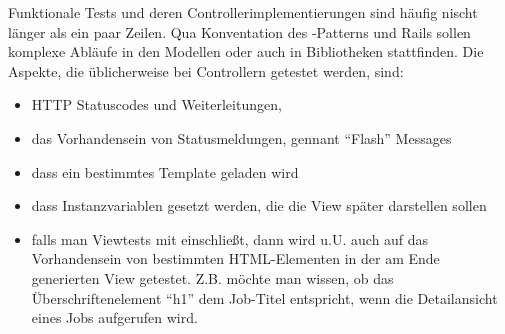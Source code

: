 Funktionale Tests und deren Controllerimplementierungen sind häufig nischt länger als ein paar Zeilen. Qua Konventation des -Patterns und Rails sollen komplexe Abläufe in den Modellen oder auch in Bibliotheken stattfinden. 
Die Aspekte, die üblicherweise bei Controllern getestet werden, sind:
\begin{itemize}
 \item HTTP Statuscodes und Weiterleitungen,
 \item das Vorhandensein von Statusmeldungen, gennant "`Flash"' Messages
 \item dass ein bestimmtes Template geladen wird
 \item dass Instanzvariablen gesetzt werden, die die View später darstellen sollen
 \item falls man Viewtests mit einschließt, dann wird u.U. auch auf das Vorhandensein von bestimmten HTML-Elementen in der am Ende generierten View getestet. Z.B. möchte man wissen, ob das Überschriftenelement "`h1"' dem Job-Titel entspricht, wenn die Detailansicht eines Jobs aufgerufen wird.
\end{itemize}